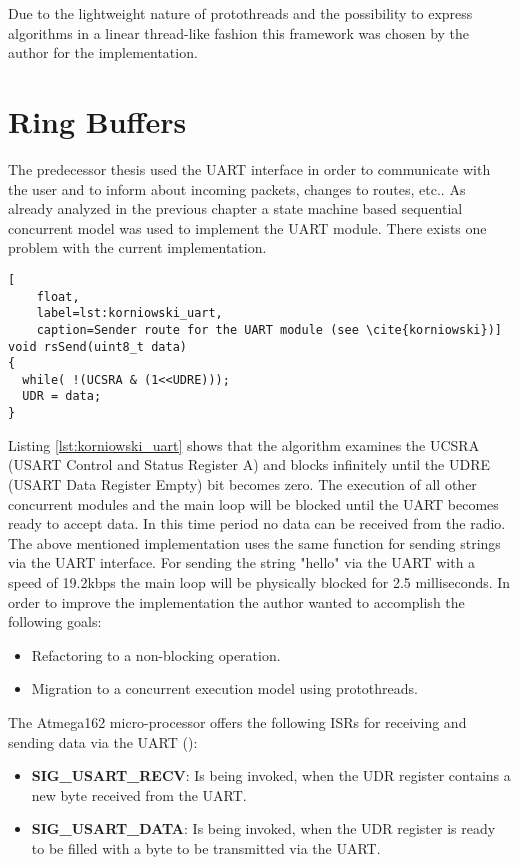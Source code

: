 Due to the lightweight nature of protothreads and the possibility to express algorithms in a linear thread-like fashion this framework was chosen by the author for the implementation.

\section{Ring Buffers}
The predecessor thesis \cite{korniowski} used the UART interface in order to communicate with the user and to inform about incoming packets, changes to routes, etc.. As already analyzed in the previous chapter a state machine based sequential concurrent model was used to implement the UART module. There exists one problem with the current implementation.

\begin{lstlisting}[
	float,
	label=lst:korniowski_uart,
	caption=Sender route for the UART module (see \cite{korniowski})]
void rsSend(uint8_t data)
{
  while( !(UCSRA & (1<<UDRE)));
  UDR = data;
}
\end{lstlisting}

Listing \ref{lst:korniowski_uart} shows that the algorithm examines the UCSRA (USART Control and Status Register A) and blocks infinitely until the UDRE (USART Data Register Empty) bit becomes zero. The execution of all other concurrent modules and the main loop will be blocked until the UART becomes ready to accept data. In this time period no data can be received from the radio. The above mentioned implementation uses the same function for sending strings via the UART interface. For sending the string "hello" via the UART with a speed of 19.2kbps the main loop will be physically blocked for 2.5 milliseconds. In order to improve the implementation the author wanted to accomplish the following goals:

\begin{itemize}
\item Refactoring to a non-blocking operation.
\item Migration to a concurrent execution model using protothreads.
\end{itemize}

The Atmega162 micro-processor offers the following ISRs for receiving and sending data via the UART (\cite{atmega162datasheet}):

\begin{itemize}
\item \textbf{SIG\_USART\_RECV}: Is being invoked, when the UDR register contains a new byte received from the UART.
\item \textbf{SIG\_USART\_DATA}: Is being invoked, when the UDR register is ready to be filled with a byte to be transmitted via the UART.
\end{itemize}

